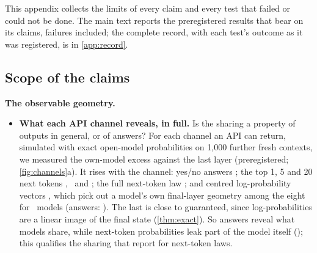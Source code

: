 This appendix collects the limits of every claim and every test that failed or could not be done. The main text reports the preregistered results that bear on its claims, failures
included; the complete record, with each test's outcome as it was registered,
is in \cref{app:record}.

\subsection{Scope of the claims}
\textbf{The observable geometry.}
\begin{itemize}
\item \textbf{What each API channel reveals, in full.}\label{app:channels} Is the sharing a property of outputs in general, or of answers? For each channel an API can return, simulated with exact open-model probabilities on 1{,}000 further fresh contexts, we measured the own-model excess against the last layer (preregistered; \cref{fig:channels}a). It rises with the channel: yes/no answers \GSevLAns; the top 1, 5 and 20 next tokens \GSevLTopOne, \GSevLTopFive\ and \GSevLTopTwenty; the full next-token law \GSevLFull; and centred log-probability vectors \GSevLLogprob, which pick out a model's own final-layer geometry among the eight for \GSevBestLogprob\ models (answers: \GSevBestAns). The last is close to guaranteed, since log-probabilities are a linear image of the final state (\cref{thm:exact}). So answers reveal what models share, while next-token probabilities leak part of the model itself (\GSevOut); this qualifies the sharing that \citet{picozzi2026information} report for next-token laws.

\end{itemize}
